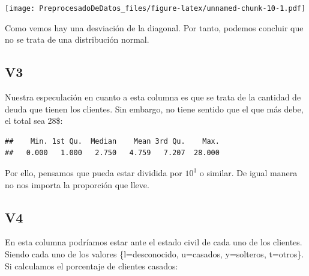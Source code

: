 \documentclass[
]{article}
\newenvironment{Shaded}{\begin{snugshade}}{\end{snugshade}}
\newcommand{\AttributeTok}[1]{\textcolor[rgb]{0.13,0.29,0.53}{#1}}
\newcommand{\ConstantTok}[1]{\textcolor[rgb]{0.56,0.35,0.01}{#1}}
\newcommand{\DecValTok}[1]{\textcolor[rgb]{0.00,0.00,0.81}{#1}}
\newcommand{\FunctionTok}[1]{\textcolor[rgb]{0.13,0.29,0.53}{\textbf{#1}}}
\newcommand{\NormalTok}[1]{#1}
\newcommand{\OtherTok}[1]{\textcolor[rgb]{0.56,0.35,0.01}{#1}}
\newcommand{\SpecialCharTok}[1]{\textcolor[rgb]{0.81,0.36,0.00}{\textbf{#1}}}
\newcommand{\StringTok}[1]{\textcolor[rgb]{0.31,0.60,0.02}{#1}}
\begin{document}
\texttt{[image: PreprocesadoDeDatos\_files/figure-latex/unnamed-chunk-10-1.pdf]}

Como vemos hay una desviación de la diagonal. Por tanto, podemos
concluir que no se trata de una distribución normal.

\hypertarget{v3}{%
\subsection{V3}\label{v3}}

Nuestra especulación en cuanto a esta columna es que se trata de la
cantidad de deuda que tienen los clientes. Sin embargo, no tiene sentido
que el que más debe, el total sea 28\$:

\begin{Shaded}
\end{Shaded}

\begin{verbatim}
##    Min. 1st Qu.  Median    Mean 3rd Qu.    Max. 
##   0.000   1.000   2.750   4.759   7.207  28.000
\end{verbatim}

Por ello, pensamos que pueda estar dividida por \(10^{3}\) o similar. De
igual manera no nos importa la proporción que lleve.

\hypertarget{v4}{%
\subsection{V4}\label{v4}}

En esta columna podríamos estar ante el estado civil de cada uno de los
clientes. Siendo cada uno de los valores \{l=desconocido, u=casados,
y=solteros, t=otros\}. Si calculamos el porcentaje de clientes casados:

\begin{Shaded}
\end{Shaded}
\end{document}
